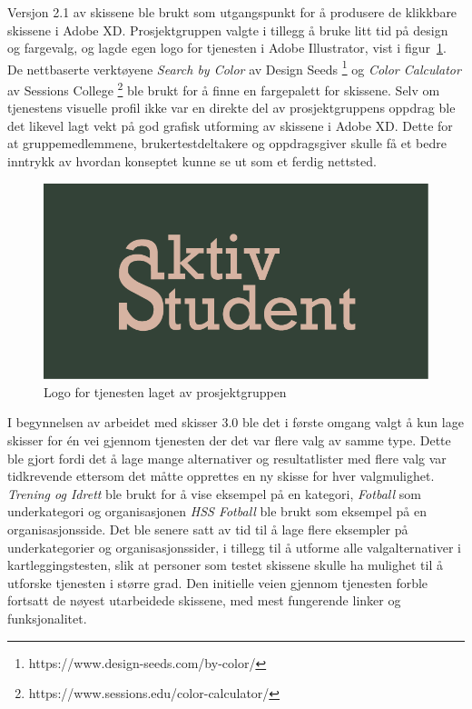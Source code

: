 Versjon 2.1 av skissene ble brukt som utgangspunkt for å produsere de klikkbare skissene i Adobe XD. Prosjektgruppen valgte i tillegg å bruke litt tid på design og fargevalg, og lagde egen logo for tjenesten i Adobe Illustrator, vist i figur~\ref{fig:aktivStudentLogo}. De nettbaserte verktøyene {\em  Search by Color} av Design Seeds \footnote{https://www.design-seeds.com/by-color/} og {\em  Color Calculator} av Sessions College \footnote{https://www.sessions.edu/color-calculator/} ble brukt for å finne en fargepalett for skissene. Selv om tjenestens visuelle profil ikke var en direkte del av prosjektgruppens oppdrag ble det likevel lagt vekt på god grafisk utforming av skissene i Adobe XD. Dette for at gruppemedlemmene, brukertestdeltakere og oppdragsgiver skulle få et bedre inntrykk av hvordan konseptet kunne se ut som et ferdig nettsted.

\begin{figure}[H]
\centering
\includegraphics[width=.7\textwidth]{Illustrasjoner/aktivstudentlogo.png}
\caption{Logo for tjenesten laget av prosjektgruppen}
\label{fig:aktivStudentLogo}
\end{figure}

I begynnelsen av arbeidet med skisser 3.0 ble det i første omgang valgt å kun lage skisser for én vei gjennom tjenesten der det var flere valg av samme type. Dette ble gjort fordi det å lage mange alternativer og resultatlister med flere valg var tidkrevende ettersom det måtte opprettes en ny skisse for hver valgmulighet. {\em  Trening og Idrett} ble brukt for å vise eksempel på en kategori, {\em  Fotball} som underkategori og organisasjonen {\em  HSS Fotball} ble brukt som eksempel på en organisasjonsside. Det ble senere satt av tid til å lage flere eksempler på underkategorier og organisasjonssider, i tillegg til å utforme alle valgalternativer i kartleggingstesten, slik at personer som testet skissene skulle ha mulighet til å utforske tjenesten i større grad. Den initielle veien gjennom tjenesten forble fortsatt de nøyest utarbeidede skissene, med mest fungerende linker og funksjonalitet.

